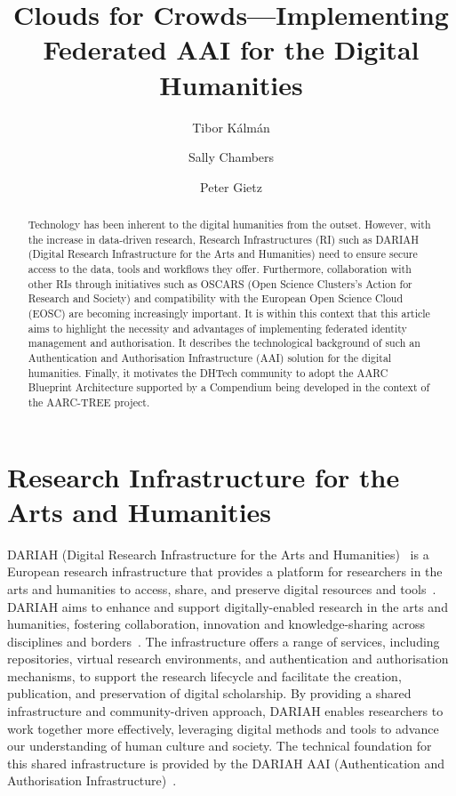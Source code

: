 \documentclass[final]{anthology-ch} %
\title{Clouds for Crowds---Implementing Federated AAI for the Digital Humanities}
\author[1]{Tibor Kálmán}[
  orcid=0000-0001-5194-5053
]
\author[2]{Sally Chambers}[
  orcid=0000-0002-2430-475X
]
\author[3]{Peter Gietz}[
  orcid=0000-0002-8310-2015
]
\affiliation{1}{GWDG, Göttingen, Germany}
\affiliation{2}{DARIAH, Paris, France}
\affiliation{3}{DAASI International, Tübingen, Germany}
\begin{document}
\maketitle

\begin{abstract}
Technology has been inherent to the digital humanities from the outset. However, with the increase in data-driven research, Research Infrastructures (RI) such as DARIAH (Digital Research Infrastructure for the Arts and Humanities) need to ensure secure access to the data, tools and workflows they offer. Furthermore, collaboration with other RIs through initiatives such as OSCARS (Open Science Clusters’s Action for Research and Society) and compatibility with the European Open Science Cloud (EOSC) are becoming increasingly important. It is within this context that this article aims to highlight the necessity and advantages of implementing federated identity management and authorisation. It describes the technological background of such an Authentication and Authorisation Infrastructure (AAI) solution for the digital humanities. Finally, it motivates the DHTech community to adopt the AARC Blueprint Architecture supported by a Compendium being developed in the context of the AARC-TREE project. 
\end{abstract}



\section{Research Infrastructure for the Arts and Humanities} 

DARIAH (Digital Research Infrastructure for the Arts and Humanities)~\cite{web_dariah} is a European research infrastructure that provides a platform for researchers in the arts and humanities to access, share, and preserve digital resources and tools~\cite{sshoc_marketplace}. DARIAH aims to enhance and support digitally-enabled research in the arts and humanities, fostering collaboration, innovation and knowledge-sharing across disciplines and borders~\cite{chambers_2025_14881627}. The infrastructure offers a range of services, including repositories, virtual research environments, and authentication and authorisation mechanisms, to support the research lifecycle and facilitate the creation, publication, and preservation of digital scholarship. By providing a shared infrastructure and community-driven approach, DARIAH enables researchers to work together more effectively, leveraging digital methods and tools to advance our understanding of human culture and society. The technical foundation for this shared infrastructure is provided by the DARIAH AAI (Authentication and Authorisation Infrastructure)~.
\end{document}
